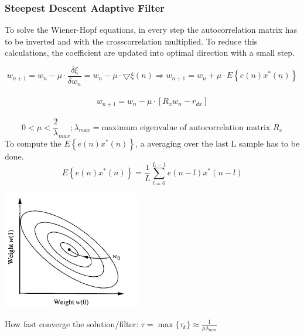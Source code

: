 \subsubsection{Steepest Descent Adaptive Filter }
To solve the Wiener-Hopf equations, in every step the autocorrelation matrix has to be inverted and with the crosscorrelation multiplied.
To reduce this calculations, the coefficient are updated into optimal direction with a small step.
\begin{minipage}{13cm}
$$w_{n+1}=w_n-\mu \cdot  \dfrac{\delta \xi}{\delta w_n} =w_n-\mu \cdot \bigtriangledown\xi(n) \Rightarrow \boxed{ w_{n+1}= w_n+\mu \cdot E\left\lbrace e(n)x^*(n)\right\rbrace}$$ \\
																											$$ \boxed{	w_{n+1}= w_n - \mu \cdot [R_x w_n - r_{dx} ]   }$$ \\
$$ 0<\mu< \frac 2 \lambda_{max}; \lambda_{max} = \text{maximum eigenvalue of autocorrelation matrix } R_x$$
To compute the $E\left\lbrace e(n)x^*(n)\right\rbrace$, a averaging over the last L sample has to be done.
$$E\left\lbrace e(n)x^*(n)\right\rbrace= \frac{1}{L}\sum\limits_{l=0}^{L-1}e(n-l)x^*(n-l)$$
\end{minipage}
\begin{minipage}{6cm}
        \includegraphics[width=6cm]{../TSM_StatDig/bilder/steepestDescent.jpg}
\end{minipage}

 How fast converge the solution/filter: $\displaystyle \tau=\max\{\tau_k\}\approx\frac{1}{\mu \lambda_{min}} $


\clearpage
